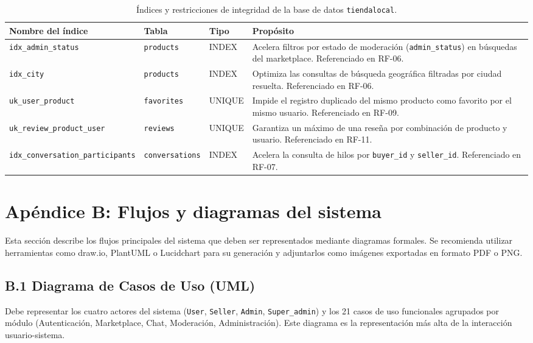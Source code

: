 \documentclass[11pt,a4paper]{report}
\begin{document}
\begin{table}[H]
\centering
\begin{tabularx}{\textwidth}{|l|l|l|L|}
\hline
{}\color{white}\textbf{Nombre del índice} & \color{white}\textbf{Tabla} & \color{white}\textbf{Tipo} & \color{white}\textbf{Propósito} \\ \hline
\texttt{idx\_admin\_status} & \texttt{products} & INDEX & Acelera filtros por estado de moderación (\texttt{admin\_status}) en búsquedas del marketplace. Referenciado en RF-06. \\ \hline
\texttt{idx\_city} & \texttt{products} & INDEX & Optimiza las consultas de búsqueda geográfica filtradas por ciudad resuelta. Referenciado en RF-06. \\ \hline
\texttt{uk\_user\_product} & \texttt{favorites} & UNIQUE & Impide el registro duplicado del mismo producto como favorito por el mismo usuario. Referenciado en RF-09. \\ \hline
\texttt{uk\_review\_product\_user} & \texttt{reviews} & UNIQUE & Garantiza un máximo de una reseña por combinación de producto y usuario. Referenciado en RF-11. \\ \hline
\texttt{idx\_conversation\_participants} & \texttt{conversations} & INDEX & Acelera la consulta de hilos por \texttt{buyer\_id} y \texttt{seller\_id}. Referenciado en RF-07. \\ \hline
\end{tabularx}
\caption{Índices y restricciones de integridad de la base de datos \texttt{tiendalocal}.}
\end{table}

\newpage
\section{Apéndice B: Flujos y diagramas del sistema}

Esta sección describe los flujos principales del sistema que deben ser representados mediante diagramas formales. Se recomienda utilizar herramientas como draw.io, PlantUML o Lucidchart para su generación y adjuntarlos como imágenes exportadas en formato PDF o PNG.

\subsection{B.1 Diagrama de Casos de Uso (UML)}
Debe representar los cuatro actores del sistema (\texttt{User}, \texttt{Seller}, \texttt{Admin}, \texttt{Super\_admin}) y los 21 casos de uso funcionales agrupados por módulo (Autenticación, Marketplace, Chat, Moderación, Administración). Este diagrama es la representación más alta de la interacción usuario-sistema.
\end{document}
